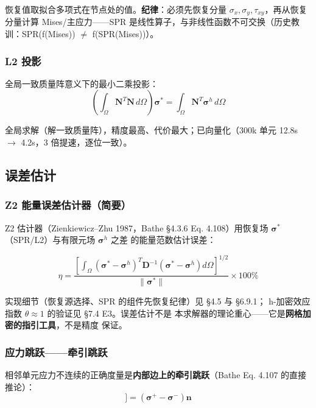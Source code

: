\documentclass[12pt,a4paper]{ctexart}
\newcommand{\llbracket}{[\![}
\newcommand{\rrbracket}{]\!]}
\begin{document}
恢复值取拟合多项式在节点处的值。\textbf{纪律}：必须先恢复分量
$\sigma_x,\sigma_y,\tau_{xy}$，再从恢复分量计算 Mises/主应力——SPR
是线性算子，与非线性函数不可交换（历史教训：SPR(f(Mises)) $\ne$
f(SPR(Mises))）。

\subsubsection{L2 投影}

全局一致质量阵意义下的最小二乘投影：
\begin{equation}
\left(\int_\Omega \mathbf{N}^T \mathbf{N}\,d\Omega\right) \boldsymbol{\sigma}^*
= \int_\Omega \mathbf{N}^T \boldsymbol{\sigma}^h\,d\Omega
\end{equation}

全局求解（解一致质量阵），精度最高、代价最大；已向量化（300k 单元
12.8s $\to$ 4.2s，3 倍提速，逐位一致）。

\subsection{误差估计}

\subsubsection{Z2 能量误差估计器（简要）}

Z2 估计器（Zienkiewicz--Zhu 1987，Bathe §4.3.6 Eq. 4.108）用恢复场
$\boldsymbol{\sigma}^*$（SPR/L2）与有限元场 $\boldsymbol{\sigma}^h$ 之差
的能量范数估计误差：

\begin{equation}
\eta = \frac{\left[ \int_\Omega \left(\boldsymbol{\sigma}^* - \boldsymbol{\sigma}^h\right)^T
\mathbf{D}^{-1} \left(\boldsymbol{\sigma}^* - \boldsymbol{\sigma}^h\right) d\Omega \right]^{1/2}}
{\|\boldsymbol{\sigma}^*\|} \times 100\%
\end{equation}

实现细节（恢复源选择、SPR 的组件先恢复纪律）见 §4.5 与 §6.9.1；
h-加密效应指数 $\theta \approx 1$ 的验证见 §7.4 E3。误差估计不是
本求解器的理论重心——它是\textbf{网格加密的指引工具}，不是精度
保证。

\subsubsection{应力跳跃——牵引跳跃}

相邻单元应力不连续的正确度量是\textbf{内部边上的牵引跳跃}（Bathe
Eq. 4.107 的直接推论）：
\begin{equation}
\llbracket \mathbf{t} \rrbracket = \left(\boldsymbol{\sigma}^+ - \boldsymbol{\sigma}^-\right)\mathbf{n}
\label{eq:tres-jump}
\end{equation}
\end{document}
